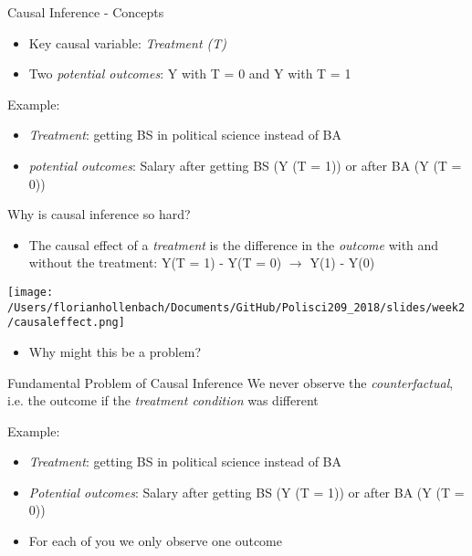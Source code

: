 \documentclass[presentation]{beamer}
\begin{document}
\begin{frame}[label={sec:orga80c11d}]{Causal Inference - Concepts}
\begin{itemize}
\item Key causal variable: \emph{Treatment (T)}
\item Two \emph{potential outcomes}: Y with T = 0 and Y with T = 1
\end{itemize}

\pause
Example:
\begin{itemize}
\item \emph{Treatment}: getting BS in political science instead of BA
\item \emph{potential outcomes}: Salary after getting BS (Y (T = 1)) or after BA (Y (T = 0))
\end{itemize}
\end{frame}


\begin{frame}[label={sec:orgf205dc7}]{Why is causal inference so hard?}
\begin{itemize}
\item The causal effect of a \emph{treatment} is the difference in the \emph{outcome} with and without the treatment:
Y(T = 1) - Y(T = 0) \(\rightarrow\) Y(1) - Y(0)
\end{itemize}

\pause
\begin{center}
\texttt{[image: /Users/florianhollenbach/Documents/GitHub/Polisci209\_2018/slides/week2/causaleffect.png]}
\end{center}

\begin{itemize}
\item Why might this be a problem?
\end{itemize}
\end{frame}

\begin{frame}[label={sec:orga88237e}]{Fundamental Problem of Causal Inference}
We never observe the \emph{counterfactual}, i.e. the outcome if the \emph{treatment condition} was different

\pause
Example:
\begin{itemize}
\item \emph{Treatment}: getting BS in political science instead of BA
\item \emph{Potential outcomes}: Salary after getting BS (Y (T = 1)) or after BA (Y (T = 0))
\item For each of you we only observe one outcome
\end{itemize}
\end{frame}
\end{document}
